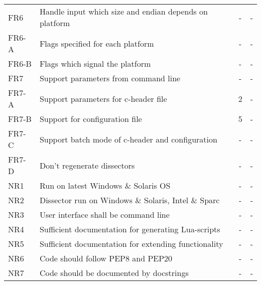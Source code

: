 \begin{table}[ht]
\begin{tabularx}{\textwidth}{l X c c}
	\addlinespace
	FR6 & Handle input which size and endian depends on platform & - & - \\
	FR6-A & Flags specified for each platform & - & - \\
	FR6-B & Flags which signal the platform & - & - \\
	\addlinespace
	FR7 & Support parameters from command line & - & - \\
	FR7-A & Support parameters for c-header file & 2 & - \\
	FR7-B & Support for configuration file & 5 & - \\
	FR7-C & Support batch mode of c-header and configuration & - & - \\
	FR7-D & Don't regenerate dissectors & - & - \\
	\addlinespace
	NR1 & Run on latest Windows \& Solaris OS & - & - \\
	NR2 & Dissector run on Windows \& Solaris, Intel \& Sparc & - & - \\
	NR3 & User interface shall be command line & - & - \\
	NR4 & Sufficient documentation for generating Lua-scripts & - & - \\
	NR5 & Sufficient documentation for extending functionality & - & - \\
	NR6 & Code should follow PEP8 and PEP20 & - & - \\
	NR7 & Code should be documented by docstrings & - & - \\
	\bottomrule
\end{tabularx}
\end{table}

